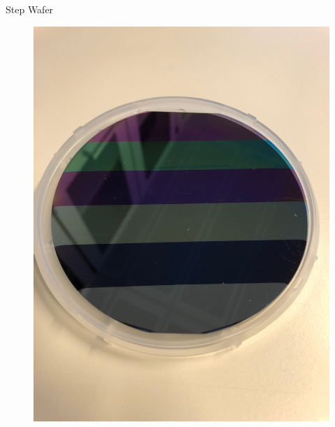 \documentclass[10pt]{beamer}
\begin{document}
\begin{frame}{Step Wafer}
	\begin{figure}
	\centering
	\includegraphics[scale=0.06,angle=-90]{stepwafer.JPG}
	\end{figure}
\end{frame}
	
	
\end{document}
